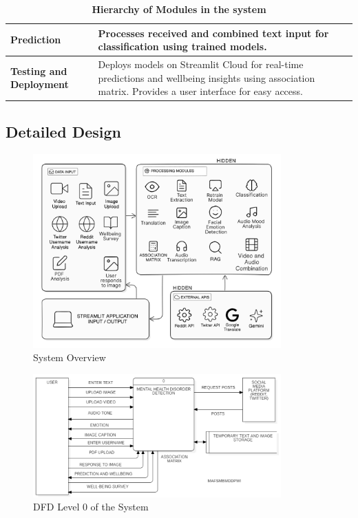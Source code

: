 \begin{table}[H]
\begin{tabularx}{\textwidth}{|p{3.5cm}|X|}
        \hline
        \textbf{Prediction} & Processes received and combined text input for classification using trained models. \\
        \hline
        \textbf{Testing and} \newline \textbf{Deployment} & Deploys models on Streamlit Cloud for real-time predictions and wellbeing insights using association matrix. Provides a user interface for easy access. \\
        \hline
    \end{tabularx}
    \caption*{\textbf{Hierarchy of Modules in the system}}
    \label{tab:modules_hierarchy}
\end{table}


\subsection{Detailed Design}
\begin{figure}[h!]  
    \centering
    \includegraphics[width=0.85\textwidth]{Images/System Overview.png}  
    \caption{System Overview}
    \label{System Overview}  %
\end{figure}

\begin{figure}[h!]  
    \centering
    \includegraphics[width=0.85\textwidth]{Images/DFD L0.png}  
    \caption{DFD Level 0 of the System}
    \label{dfdl0123}  %
\end{figure}


